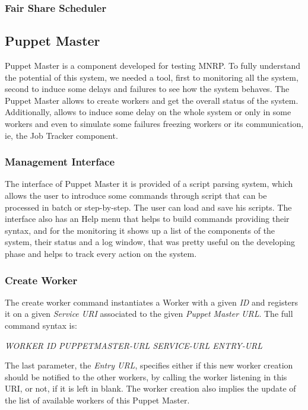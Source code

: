 \documentclass[times, 10pt,twocolumn]{article}
\begin{document}
            \subsubsection{Fair Share Scheduler}
        
    	\subsection{Puppet Master}
	      Puppet Master is a component developed for testing \ac{MNRP}. To fully understand the potential of this system, we needed a tool, first to monitoring all the system, second to induce some delays and failures to see how the system behaves. The Puppet Master allows to create workers and get the overall status of the system. Additionally, allows to induce some delay on the whole system or only in some workers and even to simulate some failures freezing workers or its communication, ie, the Job Tracker component.
            \subsubsection{Management Interface}
            The interface of Puppet Master it is provided of a script parsing system, which allows the user to introduce some commands through script that can be processed in batch or step-by-step. The user can load and save his scripts. The interface also has an Help menu that helps to build commands providing their syntax, and for the monitoring it shows up a list of the components of the system, their status and a log window, that was pretty useful on the developing phase and helps to track every action on the system.
            \subsubsection{Create Worker}
            The create worker command instantiates a Worker with a given \emph{ID} and registers it on a given \emph{Service URI} associated to the given \emph{Puppet Master URL}. The full command syntax is: 
            
            \emph{WORKER ID PUPPETMASTER-URL SERVICE-URL ENTRY-URL} 
            
            The last parameter, the \emph{Entry URL}, specifies either if this new worker creation should be notified to the other workers, by calling the worker listening in this URI, or not, if it is left in blank.
            The worker creation also implies the update of the list of available workers of this Puppet Master.
\end{document}
